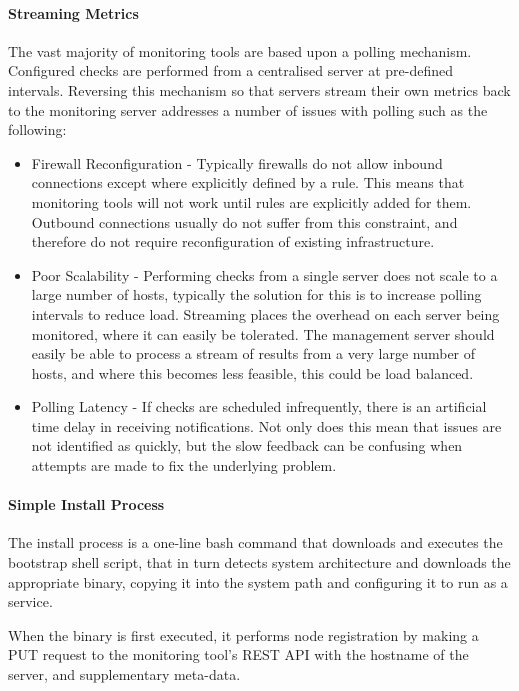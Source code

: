 \documentclass{cshonours}
\begin{document}
\paragraph{Streaming Metrics} The vast majority of monitoring tools are based upon a polling mechanism. Configured checks are performed from a centralised server at pre-defined intervals. Reversing this mechanism so that servers stream their own metrics back to the monitoring server addresses a number of issues with polling such as the following:

\begin{itemize}
  \item Firewall Reconfiguration - Typically firewalls do not allow inbound connections except where explicitly defined by a rule. This means that monitoring tools will not work until rules are explicitly added for them. Outbound connections usually do not suffer from this constraint, and therefore do not require reconfiguration of existing infrastructure.
  \item Poor Scalability - Performing checks from a single server does not scale to a large number of hosts, typically the solution for this is to increase polling intervals to reduce load. Streaming places the overhead on each server being monitored, where it can easily be tolerated. The management server should easily be able to process a stream of results from a very large number of hosts, and where this becomes less feasible, this could be load balanced.
  \item Polling Latency - If checks are scheduled infrequently, there is an artificial time delay in receiving notifications. Not only does this mean that issues are not identified as quickly, but the slow feedback can be confusing when attempts are made to fix the underlying problem.
\end{itemize}

\paragraph{Simple Install Process} The install process is a one-line bash command that downloads and executes the bootstrap shell script, that in turn detects system architecture and downloads the appropriate binary, copying it into the system path and configuring it to run as a service.

When the binary is first executed, it performs node registration by making a PUT request to the monitoring tool’s REST API with the hostname of the server, and supplementary meta-data.
\end{document}
